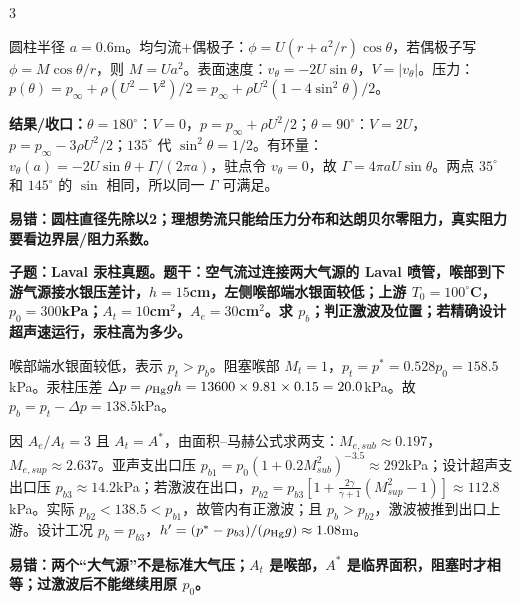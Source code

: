 \documentclass[a4paper]{article}
\newcommand{\qt}[1]{\vspace{0.04pt}\colorbox{Q}{\parbox{\dimexpr\linewidth-2\fboxsep}{\color{white}\bfseries #1}}\par}
\newcommand{\ans}[1]{\colorbox{G}{\parbox{\dimexpr\linewidth-2\fboxsep}{#1}}\par}
\newcommand{\warn}[1]{\colorbox{Y}{\parbox{\dimexpr\linewidth-2\fboxsep}{\color{E}\bfseries #1}}\par}
\newcommand{\res}[1]{{\color{E}\bfseries 结果/收口：}#1\par}
\begin{document}
\begin{multicols}{3}
\ans{圆柱半径 $a=0.6$m。均匀流+偶极子：$\phi=U(r+a^2/r)\cos\theta$，若偶极子写 $\phi=M\cos\theta/r$，则 $M=Ua^2$。表面速度：$v_\theta=-2U\sin\theta$，$V=|v_\theta|$。压力：$p(\theta)=p_\infty+\rho(U^2-V^2)/2=p_\infty+\rho U^2(1-4\sin^2\theta)/2$。}
\res{$\theta=180^\circ$：$V=0$，$p=p_\infty+\rho U^2/2$；$\theta=90^\circ$：$V=2U$，$p=p_\infty-3\rho U^2/2$；$135^\circ$ 代 $\sin^2\theta=1/2$。有环量：$v_\theta(a)=-2U\sin\theta+\Gamma/(2\pi a)$，驻点令 $v_\theta=0$，故 $\Gamma=4\pi aU\sin\theta$。两点 $35^\circ$ 和 $145^\circ$ 的 $\sin$ 相同，所以同一 $\Gamma$ 可满足。}
\warn{易错：圆柱直径先除以2；理想势流只能给压力分布和达朗贝尔零阻力，真实阻力要看边界层/阻力系数。}
\qt{子题：Laval 汞柱真题。题干：空气流过连接两大气源的 Laval 喷管，喉部到下游气源接水银压差计，$h=15$cm，左侧喉部端水银面较低；上游 $T_0=100^\circ$C，$p_0=300$kPa；$A_t=10$cm$^2$，$A_e=30$cm$^2$。求 $p_b$；判正激波及位置；若精确设计超声速运行，汞柱高为多少。}
\ans{喉部端水银面较低，表示 $p_t>p_b$。阻塞喉部 $M_t=1$，$p_t=p^*=0.528p_0=158.5$kPa。汞柱压差 $\Delta p=\rho_{\rm Hg}gh=13600\times9.81\times0.15=20.0$kPa。故 $p_b=p_t-\Delta p=138.5$kPa。}
\ans{因 $A_e/A_t=3$ 且 $A_t=A^*$，由面积--马赫公式求两支：$M_{e,sub}\approx0.197$，$M_{e,sup}\approx2.637$。亚声支出口压 $p_{b1}=p_0(1+0.2M_{sub}^2)^{-3.5}\approx292$kPa；设计超声支出口压 $p_{b3}\approx14.2$kPa；若激波在出口，$p_{b2}=p_{b3}[1+\frac{2\gamma}{\gamma+1}(M_{sup}^2-1)]\approx112.8$kPa。实际 $p_{b2}<138.5<p_{b1}$，故管内有正激波；且 $p_b>p_{b2}$，激波被推到出口上游。设计工况 $p_b=p_{b3}$，$h'=(p^*-p_{b3})/(\rho_{\rm Hg}g)\approx1.08$m。}
\warn{易错：两个“大气源”不是标准大气压；$A_t$ 是喉部，$A^*$ 是临界面积，阻塞时才相等；过激波后不能继续用原 $p_0$。}


\end{multicols}
\end{document}
